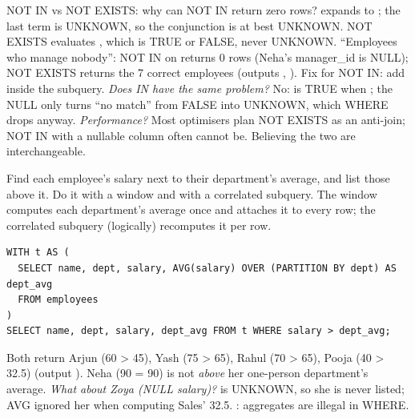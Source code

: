 \begin{qa}{\classic NOT IN vs NOT EXISTS: why can NOT IN return zero rows?}
\why {} expands to ; the last term is UNKNOWN, so the conjunction is at best UNKNOWN.
NOT EXISTS evaluates , which is TRUE or FALSE, never UNKNOWN.
\worked ``Employees who manage nobody'': NOT IN on  returns 0 rows (Neha's manager\_id is NULL); NOT EXISTS returns the 7 correct
employees (outputs , ). Fix for NOT IN: add  inside the subquery.
\pushes \emph{Does IN have the same problem?} No:  is TRUE when ; the NULL only turns ``no match'' from FALSE into
UNKNOWN, which WHERE drops anyway. \emph{Performance?} Most optimisers plan NOT EXISTS as an anti-join; NOT IN with a nullable column often cannot be.
\pitfall Believing the two are interchangeable.
\end{qa}

\begin{qa}{\classic Find each employee's salary next to their department's average, and list those above it. Do it with a window and with a correlated
subquery.}
\why The window computes each department's average once and attaches it to every row; the correlated subquery (logically) recomputes it per row.
\worked
\begin{lstlisting}[style=sql]
WITH t AS (
  SELECT name, dept, salary, AVG(salary) OVER (PARTITION BY dept) AS dept_avg
  FROM employees
)
SELECT name, dept, salary, dept_avg FROM t WHERE salary > dept_avg;
\end{lstlisting}
Both return Arjun (60 > 45), Yash (75 > 65), Rahul (70 > 65), Pooja (40 > 32.5) (output ). Neha (90 = 90) is not \emph{above} her
one-person department's average.
\pushes \emph{What about Zoya (NULL salary)?}  is UNKNOWN, so she is never listed; AVG ignored her when computing Sales' 32.5.
\pitfall {}: aggregates are illegal in WHERE.
\end{qa}

